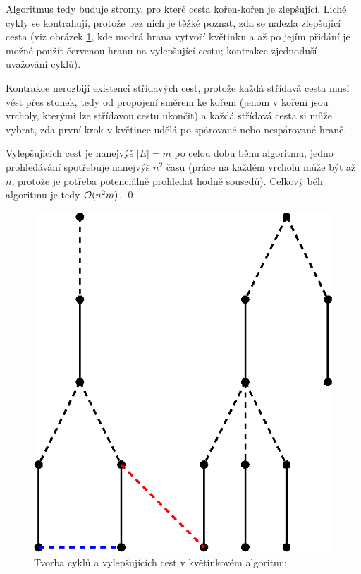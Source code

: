 Algoritmus tedy buduje stromy, pro které cesta kořen-kořen je zlepšující. Liché
cykly se kontrahují, protože bez nich je těžké poznat, zda se nalezla zlepšující
cesta (viz obrázek \ref{blossoms}, kde modrá hrana vytvoří květinku a až po
jejím přidání je možné použít červenou hranu na vylepšující cestu; kontrakce
zjednoduší uvažování cyklů).

Kontrakce nerozbijí existenci střídavých cest, protože každá střídavá cesta musí
vést přes stonek, tedy od propojení směrem ke kořeni (jenom v kořeni jsou
vrcholy, kterými lze střídavou cestu ukončit) a každá střídavá cesta si může
vybrat, zda první krok v květince udělá po spárované nebo nespárované hraně.

Vylepšujících cest je nanejvýš $|E| = m$ po celou dobu běhu algoritmu, jedno
prohledávání spotřebuje nanejvýš $n^2$ času (práce na každém vrcholu může být až
$n$, protože je potřeba potenciálně prohledat hodně sousedů). Celkový běh
algoritmu je tedy $\mathcal{O}(n^2m)$. \qed

\begin{figure}[h!]
	\centering
	\includegraphics{img/blossoms.eps}
	\caption{Tvorba cyklů a vylepšujících cest v květinkovém algoritmu}
	\label{blossoms}
\end{figure}

